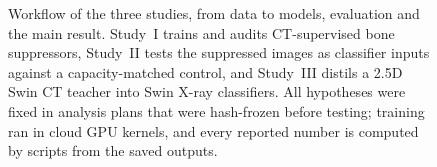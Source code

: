 \begin{figure}[!t]
\centering
{}
\caption{Workflow of the three studies, from data to models, evaluation and the main result. Study~I trains and audits CT-supervised
bone suppressors, Study~II tests the suppressed images as classifier inputs against a capacity-matched control, and Study~III distils a
2.5D Swin CT teacher into Swin X-ray classifiers. All hypotheses were fixed in analysis plans that were hash-frozen before testing;
training ran in cloud GPU kernels, and every reported number is computed by scripts from the saved outputs.}
\label{fig:workflow}
\end{figure}
